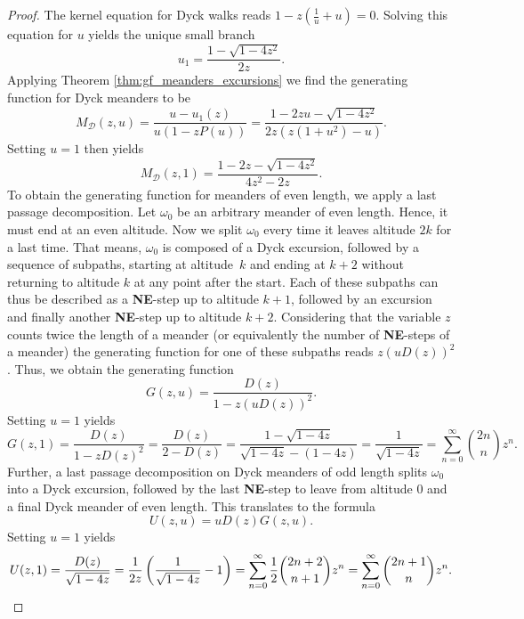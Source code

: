 \begin{proof}
  The kernel equation for Dyck walks reads $1 - z\left(\frac{1}{u} + u\right) = 0.$
  Solving this equation for $u$ yields the unique small branch 
  $$
    u_{1} = \frac{1 - \sqrt{1 - 4z^{2}}}{2z}.
  $$
  Applying Theorem \ref{thm:gf_meanders_excursions} we find the generating function for Dyck meanders to be 
  $$
    M_\mathcal{D}(z,u) = \frac{u - u_1(z)}{u(1 - zP(u))}
    = \frac{1 - 2zu - \sqrt{1 - 4z^2}}{2z(z(1 + u^2) - u)}.
  $$
  Setting $u = 1$ then yields
  \begin{equation*}
    M_\mathcal{D}(z,1) = \frac{1 - 2z - \sqrt{1 - 4z^2}}{4z^2 - 2z}.
  \end{equation*}
  To obtain the generating function for meanders of even length, we apply a last passage decomposition. Let $\omega_0$ be an arbitrary meander of even length. Hence, it must end at an even altitude. Now we split $\omega_0$ every time it leaves altitude $2k$ for a last time. That means, $\omega_0$ is composed of a Dyck excursion, followed by a sequence of subpaths, starting at altitude~$k$ and ending at $k + 2$ without returning to altitude $k$ at any point after the start. Each of these subpaths can thus be described as a \textbf{NE}-step up to altitude $k + 1$, followed by an excursion and finally another \textbf{NE}-step up to altitude $k + 2$. Considering that the variable $z$ counts twice the length of a meander (or equivalently the number of \textbf{NE}-steps of a meander) the generating function for one of these subpaths reads $z(uD(z))^2$. Thus, we obtain the generating function
  $$
    G(z,u) = \frac{D(z)}{1 - z(uD(z))^2}.
  $$
  Setting $u = 1$ yields
  \begin{equation*}
    G(z,1) = \frac{D(z)}{1 - zD(z)^2} = \frac{D(z)}{2 - D(z)} = \frac{1 - \sqrt{1 - 4z}}{\sqrt{1 - 4z} - (1 - 4z)} = \frac{1}{\sqrt{1 - 4z}}
    = \sum_{n = 0}^\infty \binom{2n}{n} z^n.
  \end{equation*}
  Further, a last passage decomposition on Dyck meanders of odd length splits $\omega_0$ into a Dyck excursion, followed by the last \textbf{NE}-step to leave from altitude $0$ and a final Dyck meander of even length. This translates to the formula
  $$
    U(z,u) = u D(z) G(z,u).
  $$
  Setting $u = 1$ yields
  \begin{equation*}
    U(z,1) = \frac{D(z)}{\sqrt{1 - 4z}} = \frac{1}{2z}\left(\frac{1}{\sqrt{1 - 4z}} - 1\right)
    = \sum_{n = 0}^\infty \frac{1}{2} \binom{2n + 2}{n + 1} z^n
    = \sum_{n = 0}^\infty \binom{2n + 1}{n} z^n. \qedhere
  \end{equation*}
\end{proof}


